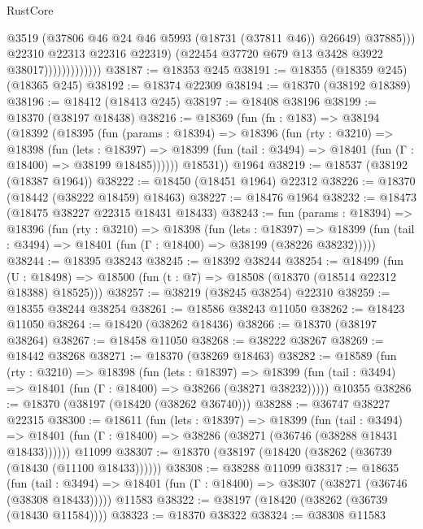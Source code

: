 \begin{lexlean}{RustCore}
\begin{coremodule}
                                    @3519
                                    (@37806 @46 @24 @46 @5993 (@18731 (@37811 @46)) @26649)
                                    @37885)))
                              @22310
                              @22313
                              @22316
                              @22319)
                            (@22454 @37720 @679 @13 @3428 @3922 @38017)))))))))))))
@38187 := @18353 @245
@38191 := @18355 (@18359 @245) (@18365 @245)
@38192 := @18374 @22309
@38194 := @18370 (@38192 @18389)
@38196 := @18412 (@18413 @245)
@38197 := @18408 @38196
@38199 := @18370 (@38197 @18438)
@38216 := @18369
    (fun (fn : @183) =>
    @38194
      (@18392
        (@18395
          (fun (params : @18394) =>
          @18396
            (fun (rty : @3210) =>
            @18398
              (fun (lets : @18397) =>
              @18399 (fun (tail : @3494) => @18401 (fun (Γ : @18400) => @38199 @18485))))))
        @18531))
    @1964
@38219 := @18537 (@38192 (@18387 @1964))
@38222 := @18450 (@18451 @1964) @22312
@38226 := @18370 (@18442 (@38222 @18459) @18463)
@38227 := @18476 @1964
@38232 := @18473 (@18475 @38227 @22315 @18431 @18433)
@38243 := fun (params : @18394) =>
  @18396
    (fun (rty : @3210) =>
    @18398
      (fun (lets : @18397) =>
      @18399 (fun (tail : @3494) => @18401 (fun (Γ : @18400) => @38199 (@38226 @38232)))))
@38244 := @18395 @38243
@38245 := @18392 @38244
@38254 := @18499
    (fun (U : @18498) => @18500 (fun (t : @7) => @18508 (@18370 (@18514 @22312 @18388) @18525)))
@38257 := @38219 (@38245 @38254) @22310
@38259 := @18355 @38244 @38254
@38261 := @18586 @38243 @11050
@38262 := @18423 @11050
@38264 := @18420 (@38262 @18436)
@38266 := @18370 (@38197 @38264)
@38267 := @18458 @11050
@38268 := @38222 @38267
@38269 := @18442 @38268
@38271 := @18370 (@38269 @18463)
@38282 := @18589
    (fun (rty : @3210) =>
    @18398
      (fun (lets : @18397) =>
      @18399 (fun (tail : @3494) => @18401 (fun (Γ : @18400) => @38266 (@38271 @38232)))))
    @10355
@38286 := @18370 (@38197 (@18420 (@38262 @36740)))
@38288 := @36747 @38227 @22315
@38300 := @18611
    (fun (lets : @18397) =>
    @18399
      (fun (tail : @3494) =>
      @18401 (fun (Γ : @18400) => @38286 (@38271 (@36746 (@38288 @18431 @18433))))))
    @11099
@38307 := @18370 (@38197 (@18420 (@38262 (@36739 (@18430 (@11100 @18433))))))
@38308 := @38288 @11099
@38317 := @18635
    (fun (tail : @3494) => @18401 (fun (Γ : @18400) => @38307 (@38271 (@36746 (@38308 @18433)))))
    @11583
@38322 := @38197 (@18420 (@38262 (@36739 (@18430 @11584))))
@38323 := @18370 @38322
@38324 := @38308 @11583

\end{coremodule}
\end{lexlean}
